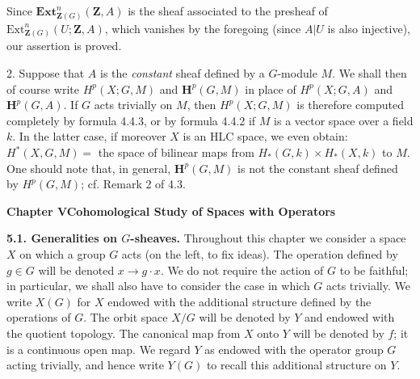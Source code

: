 \clearpage
{}

Since $\mathbf{Ext}_{\mathbf Z(G)}^n(\mathbf Z,A)$ is the sheaf associated to
the presheaf of $\mathrm{Ext}_{\mathbf Z(G)}^n(U;\mathbf Z,A)$, which vanishes
by the foregoing (since $A|U$ is also injective), our assertion is proved.

2. Suppose that $A$ is the \textit{constant} sheaf defined by a
$G$-module $M$. We shall then of course write $H^p(X;G,M)$ and
$\mathbf H^p(G,M)$ in place of $H^p(X;G,A)$ and $\mathbf H^p(G,A)$. If $G$
acts trivially on $M$, then $H^p(X;G,M)$ is therefore computed completely by
formula 4.4.3, or by formula 4.4.2 if $M$ is a vector space over a field $k$.
In the latter case, if moreover $X$ is an HLC space, we even obtain:
$H^*(X,G,M)=$ the space of bilinear maps from
$H_*(G,k)\times H_*(X,k)$ to $M$.
One should note that, in general, $\mathbf H^p(G,M)$ is not the constant sheaf
defined by $H^p(G,M)$; cf. Remark 2 of 4.3.

\bigskip
\begin{center}
{\large\bfseries Chapter V\quad Cohomological Study of Spaces with Operators}
\end{center}

\textbf{5.1. Generalities on $G$-sheaves.}
Throughout this chapter we consider a space $X$ on which a group $G$ acts
(on the left, to fix ideas). The operation defined by $g\in G$ will be denoted
$x\to g\mathbin{\cdot}x$. We do not require the action of $G$ to be
faithful; in particular, we shall also have to consider the case in which $G$
acts trivially. We write $X(G)$ for $X$ endowed with the additional structure
defined by the operations of $G$. The orbit space $X/G$ will be denoted by
$Y$ and endowed with the quotient topology. The canonical map from $X$ onto
$Y$ will be denoted by $f$; it is a continuous open map. We regard $Y$ as
endowed with the operator group $G$ acting trivially, and hence write $Y(G)$
to recall this additional structure on $Y$.

